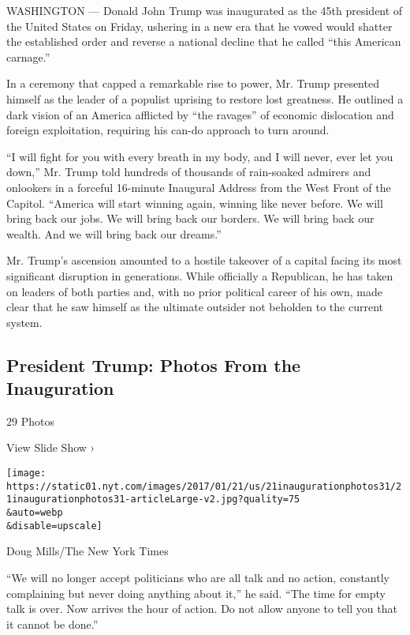 WASHINGTON --- Donald John Trump was inaugurated as the 45th president
of the United States on Friday, ushering in a new era that he vowed
would shatter the established order and reverse a national decline that
he called ``this American carnage.''

In a ceremony that capped a remarkable rise to power, Mr. Trump
presented himself as the leader of a populist uprising to restore lost
greatness. He outlined a dark vision of an America afflicted by ``the
ravages'' of economic dislocation and foreign exploitation, requiring
his can-do approach to turn around.

``I will fight for you with every breath in my body, and I will never,
ever let you down,'' Mr. Trump told hundreds of thousands of rain-soaked
admirers and onlookers in a forceful 16-minute Inaugural Address from
the West Front of the Capitol. ``America will start winning again,
winning like never before. We will bring back our jobs. We will bring
back our borders. We will bring back our wealth. And we will bring back
our dreams.''

Mr. Trump's ascension amounted to a hostile takeover of a capital facing
its most significant disruption in generations. While officially a
Republican, he has taken on leaders of both parties and, with no prior
political career of his own, made clear that he saw himself as the
ultimate outsider not beholden to the current system.

\href{https://www.nytimes.com/slideshow/2017/01/20/us/trump-inauguration-photos.html}{}

\hypertarget{president-trump-photos-from-the-inauguration}{%
\subsection{President Trump: Photos From the
Inauguration}\label{president-trump-photos-from-the-inauguration}}

29 Photos

View Slide Show ›

\texttt{[image: https://static01.nyt.com/images/2017/01/21/us/21inaugurationphotos31/21inaugurationphotos31-articleLarge-v2.jpg?quality=75\\\&auto=webp\\\&disable=upscale]}

Doug Mills/The New York Times

``We will no longer accept politicians who are all talk and no action,
constantly complaining but never doing anything about it,'' he said.
``The time for empty talk is over. Now arrives the hour of action. Do
not allow anyone to tell you that it cannot be done.''

